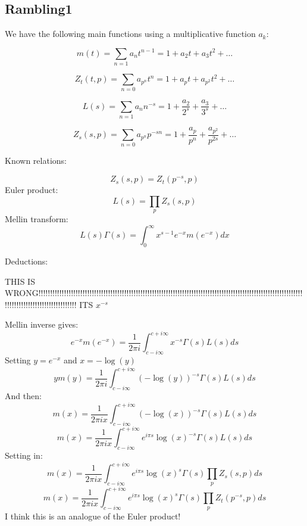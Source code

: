 \documentclass[a4paper]{amsart}
\begin{document}
\subsection{Rambling1}

We have the following main functions using a multiplicative function $a_k$:

$$m(t) = \sum_{n = 1} a_nt^{n - 1} = 1 + a_2t + a_3t^2 + \ldots$$

$$Z_t(t, p) = \sum_{n = 0} a_{p^n} t^n = 1 + a_pt + a_{p^2}t^2 + \ldots$$

$$L(s) = \sum_{n = 1} a_n n^{-s} = 1 + \frac{a_2}{2^s} + \frac{a_3}{3^s} + \ldots$$

$$Z_s(s, p) = \sum_{n = 0} a_{p^n} p^{-sn} = 1 + \frac{a_p}{p^n} + \frac{a_{p^2}}{p^{2s}} + \ldots$$

Known relations:

$$Z_s(s, p) = Z_t(p^{-s}, p)$$
Euler product:
$$L(s) = \prod_p Z_s(s, p)$$
Mellin transform:
$$L(s)\Gamma(s) = \int_0^{\infty} x^{s - 1} e^{-x} m(e^{-x})dx$$

Deductions:

THIS IS WRONG!!!!!!!!!!!!!!!!!!!!!!!!!!!!!!!!!!!!!!!!!!!!!!!!!!!!!!!!!!!!!!!!!!!!!!!!!!!!!!!!!!!!!!!!!!!!!!!!!!!!!!!!!!!!!!!!!!!!!!!!!!!!!!!!!!!!!!!!!!!!!!!!!
ITS $x^{-s}$


Mellin inverse gives:
$$e^{-x}m(e^{-x}) = \frac{1}{2\pi i}\int_{c - i\infty}^{c + i\infty}x^{-s} \Gamma(s)L(s)ds$$
Setting $y = e^{-x}$ and $x = -\log(y)$
$$y m(y) = \frac{1}{2\pi i}\int_{c - i\infty}^{c + i\infty}(-\log(y))^{-s} \Gamma(s)L(s)ds$$
And then:
$$m(x) = \frac{1}{2\pi i x} \int_{c - i\infty}^{c + i\infty}(-\log(x))^{-s} \Gamma(s)L(s)ds$$
$$m(x) = \frac{1}{2\pi i x} \int_{c - i\infty}^{c + i\infty}e^{i\pi s}\log(x)^{-s} \Gamma(s)L(s)ds$$
Setting in:
$$m(x) = \frac{1}{2\pi i x} \int_{c - i\infty}^{c + i\infty}e^{i\pi s}\log(x)^s \Gamma(s)\prod_p Z_s(s, p)ds$$
$$m(x) = \frac{1}{2\pi i x} \int_{c - i\infty}^{c + i\infty}e^{i\pi s}\log(x)^s \Gamma(s)\prod_p Z_t(p^{-s}, p)ds$$
I think this is an analogue of the Euler product!
\end{document}
